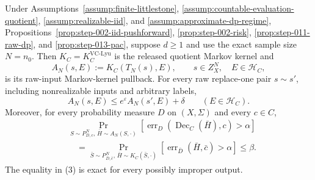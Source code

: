 \begin{proposition}\label{prop:step-014-interface}
Under Assumptions~\ref{assump:finite-littlestone},
\ref{assump:countable-evaluation-quotient},
\ref{assump:realizable-iid}, and
\ref{assump:approximate-dp-regime}, 
Propositions~\ref{prop:step-002-iid-pushforward},
\ref{prop:step-002-risk},
\ref{prop:step-011-raw-dp}, and
\ref{prop:step-013-pac}, suppose \(d\geq1\) and use the exact sample size
\(N=n_0\). Then \(K_C=K_C^{\mathrm{VC\text{-}Lyu}}\) is the released
quotient Markov kernel and
\[
 A_N(s,E):=K_C(T_N(s),E),
 \qquad s\in Z_X^N,\quad E\in\mathcal H_C,
\tag{1}
\]
is its raw-input Markov-kernel pullback. For every raw replace-one pair
\(s\sim s'\), including nonrealizable inputs and arbitrary labels,
\[
 A_N(s,E)\leq e^\varepsilon A_N(s',E)+\delta
 \qquad(E\in\mathcal H_C).
\tag{2}
\]
Moreover, for every probability measure \(D\) on \((X,\Sigma)\) and every
\(c\in C\),
\[
\begin{aligned}
&\Pr_{S\sim P_{D,c}^N,\,\bar H\sim A_N(S,\cdot)}
 \left[
 \operatorname{err}_D(\operatorname{Dec}_C(\bar H),c)>\alpha
 \right]\\
&\quad =
\Pr_{\bar S\sim P_{\bar D,\bar c}^N,\,
      \bar H\sim K_C(\bar S,\cdot)}
 \left[
 \operatorname{err}_{\bar D}(\bar H,\bar c)>\alpha
 \right]
\leq\beta.
\end{aligned}
\tag{3}
\]
The equality in (3) is exact for every possibly improper output.


\end{proposition}

